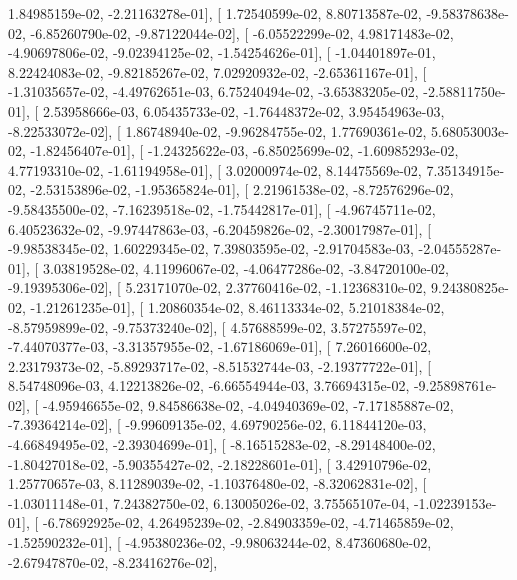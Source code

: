 \documentclass{article}
\begin{document}
          1.84985159e-02,  -2.21163278e-01],
       [  1.72540599e-02,   8.80713587e-02,  -9.58378638e-02,
         -6.85260790e-02,  -9.87122044e-02],
       [ -6.05522299e-02,   4.98171483e-02,  -4.90697806e-02,
         -9.02394125e-02,  -1.54254626e-01],
       [ -1.04401897e-01,   8.22424083e-02,  -9.82185267e-02,
          7.02920932e-02,  -2.65361167e-01],
       [ -1.31035657e-02,  -4.49762651e-03,   6.75240494e-02,
         -3.65383205e-02,  -2.58811750e-01],
       [  2.53958666e-03,   6.05435733e-02,  -1.76448372e-02,
          3.95454963e-03,  -8.22533072e-02],
       [  1.86748940e-02,  -9.96284755e-02,   1.77690361e-02,
          5.68053003e-02,  -1.82456407e-01],
       [ -1.24325622e-03,  -6.85025699e-02,  -1.60985293e-02,
          4.77193310e-02,  -1.61194958e-01],
       [  3.02000974e-02,   8.14475569e-02,   7.35134915e-02,
         -2.53153896e-02,  -1.95365824e-01],
       [  2.21961538e-02,  -8.72576296e-02,  -9.58435500e-02,
         -7.16239518e-02,  -1.75442817e-01],
       [ -4.96745711e-02,   6.40523632e-02,  -9.97447863e-03,
         -6.20459826e-02,  -2.30017987e-01],
       [ -9.98538345e-02,   1.60229345e-02,   7.39803595e-02,
         -2.91704583e-03,  -2.04555287e-01],
       [  3.03819528e-02,   4.11996067e-02,  -4.06477286e-02,
         -3.84720100e-02,  -9.19395306e-02],
       [  5.23171070e-02,   2.37760416e-02,  -1.12368310e-02,
          9.24380825e-02,  -1.21261235e-01],
       [  1.20860354e-02,   8.46113334e-02,   5.21018384e-02,
         -8.57959899e-02,  -9.75373240e-02],
       [  4.57688599e-02,   3.57275597e-02,  -7.44070377e-03,
         -3.31357955e-02,  -1.67186069e-01],
       [  7.26016600e-02,   2.23179373e-02,  -5.89293717e-02,
         -8.51532744e-03,  -2.19377722e-01],
       [  8.54748096e-03,   4.12213826e-02,  -6.66554944e-03,
          3.76694315e-02,  -9.25898761e-02],
       [ -4.95946655e-02,   9.84586638e-02,  -4.04940369e-02,
         -7.17185887e-02,  -7.39364214e-02],
       [ -9.99609135e-02,   4.69790256e-02,   6.11844120e-03,
         -4.66849495e-02,  -2.39304699e-01],
       [ -8.16515283e-02,  -8.29148400e-02,  -1.80427018e-02,
         -5.90355427e-02,  -2.18228601e-01],
       [  3.42910796e-02,   1.25770657e-03,   8.11289039e-02,
         -1.10376480e-02,  -8.32062831e-02],
       [ -1.03011148e-01,   7.24382750e-02,   6.13005026e-02,
          3.75565107e-04,  -1.02239153e-01],
       [ -6.78692925e-02,   4.26495239e-02,  -2.84903359e-02,
         -4.71465859e-02,  -1.52590232e-01],
       [ -4.95380236e-02,  -9.98063244e-02,   8.47360680e-02,
         -2.67947870e-02,  -8.23416276e-02],
\end{document}
